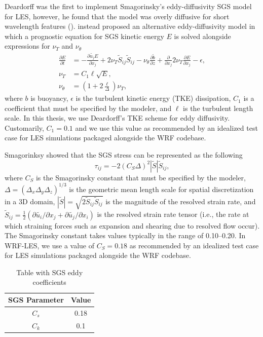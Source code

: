 Deardorff was the first to implement Smagorinsky's eddy-diffusivity SGS model for LES, however, he found that the model was overly diffusive for short wavelength features (\cite{deardorff_numerical_1970}). \cite{deardorff_stratocumulus-capped_1980} instead proposed an alternative eddy-diffusivity model in which a prognostic equation for SGS kinetic energy $E$ is solved alongside expressions for $\nu_T$ and $\nu_{\theta}$
\begin{align}
\frac{\partial E}{\partial t}  &= -\frac{\partial\tilde{u_j}E}{\partial x_j} + 2\nu_T\tilde{S}_{ij}\tilde{S}_{ij} - \nu_{\theta}\frac{\partial \tilde{b}}{\partial z} + \frac{\partial}{\partial x_j}2\nu_T\frac{\partial E}{\partial x_j} - \epsilon, \\
\nu_T &= C_1\ell\sqrt{E}, \\ 
\nu_{\theta} &= \left(1 + 2 \frac{\ell}{\Delta}\right)\nu_T,
\end{align}
where $b$ is buoyancy, $\epsilon$ is the turbulent kinetic energy (TKE) dissipation, $C_1$ is a coefficient that must be specified by the modeler, and $\ell$ is the turbulent length scale. In this thesis, we use Deardorff's TKE scheme for eddy diffusivity. Customarily, $C_1 = 0.1$ and we use this value as recommended by an idealized test case for LES simulations packaged alongside the WRF codebase.

\iffalse

Smagorinksy showed that the SGS stress can be represented as the following 
\begin{equation}
	\tau_{ij} = -2\left(C_S\Delta\right)^2 |\tilde{S}| \tilde{S}_{ij},
\label{equation:smagorinsky_sgs_stress}
\end{equation}
where $C_S$ is the Smagorinsky constant that must be specified by the modeler, $\Delta = (\Delta_x \Delta_y \Delta_z)^{1/3}$ is the geometric mean length scale for spatial discretization in a 3D domain, $|\tilde{S}| =\sqrt{2\tilde{S}_{ij}\tilde{S}_{ij}}$ is the magnitude of the resolved strain rate, and $\tilde{S}_{ij} = \frac{1}{2} (\partial\tilde{u_i}/\partial x_j + \partial\tilde{u_j}/\partial x_i )$ is the resolved strain rate tensor (i.e., the rate at which straining forces such as expansion and shearing due to resolved flow occur). The Smagorinsky constant takes values typically in the range of 0.10--0.20. In WRF-LES, we use a value of $C_S = 0.18$ as recommended by an idealized test case for LES simulations packaged alongside the WRF codebase.
\begin{table}[h!]
\centering
\begin{tabular}{||c c||} 
 \hline
 SGS Parameter & Value\\ [0.5ex] 
 \hline\hline
 $C_s$ & 0.18 \\ 
 $C_k$ & 0.1 \\ [1ex] 
 \hline
\end{tabular}
\caption{Table with SGS eddy coefficients}
\label{table:1}
\end{table}

